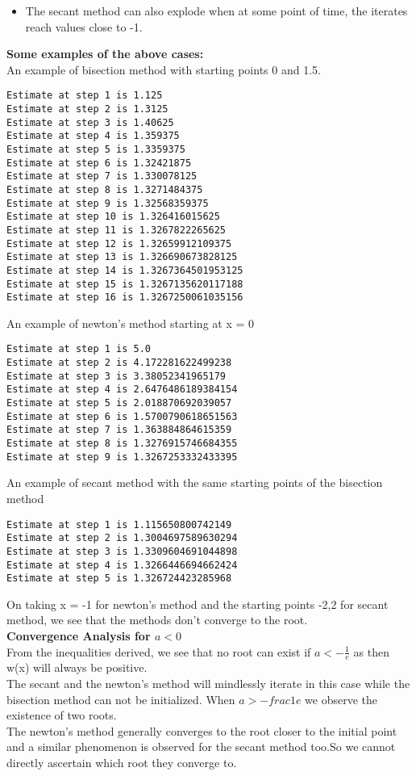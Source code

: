 \documentclass[letterpaper]{exam}
\begin{document}
\begin{questions}
\begin{solution}
\begin{itemize}
    \item The secant method can also explode when at some point of time, the iterates reach values close to -1.
\end{itemize}
\textbf{Some examples of the above cases:}\\
An example of bisection method with starting points 0 and 1.5.
\begin{verbatim}
Estimate at step 1 is 1.125
Estimate at step 2 is 1.3125
Estimate at step 3 is 1.40625
Estimate at step 4 is 1.359375
Estimate at step 5 is 1.3359375
Estimate at step 6 is 1.32421875
Estimate at step 7 is 1.330078125
Estimate at step 8 is 1.3271484375
Estimate at step 9 is 1.32568359375
Estimate at step 10 is 1.326416015625
Estimate at step 11 is 1.3267822265625
Estimate at step 12 is 1.32659912109375
Estimate at step 13 is 1.326690673828125
Estimate at step 14 is 1.3267364501953125
Estimate at step 15 is 1.3267135620117188
Estimate at step 16 is 1.3267250061035156  
\end{verbatim}
An example of newton's method starting at x = 0
\begin{verbatim}
Estimate at step 1 is 5.0
Estimate at step 2 is 4.172281622499238
Estimate at step 3 is 3.38052341965179
Estimate at step 4 is 2.6476486189384154
Estimate at step 5 is 2.018870692039057
Estimate at step 6 is 1.5700790618651563
Estimate at step 7 is 1.363884864615359
Estimate at step 8 is 1.3276915746684355
Estimate at step 9 is 1.3267253332433395
\end{verbatim}
An example of secant method with the same starting points of the bisection method
\begin{verbatim}
Estimate at step 1 is 1.115650800742149
Estimate at step 2 is 1.3004697589630294
Estimate at step 3 is 1.3309604691044898
Estimate at step 4 is 1.3266446694662424
Estimate at step 5 is 1.326724423285968
\end{verbatim}
On taking x = -1 for newton's method and the starting points -2,2 for secant method, we see that the methods don't converge to the root.\\
\textbf{Convergence Analysis for $a < 0$}\\
From the inequalities derived, we see that no root can exist if $a < -\frac{1}{e}$ as then w(x) will always be positive.\\
The secant and the newton's method will mindlessly iterate in this case while the bisection method can not be initialized.
When $a >-frac{1}{e}$ we observe the existence of two roots.\\
The newton's method generally converges to the root closer to the initial point and a similar phenomenon is observed for the secant method too.So we cannot directly ascertain which root they converge to.\\

\end{solution}
\end{questions}
\end{document}

